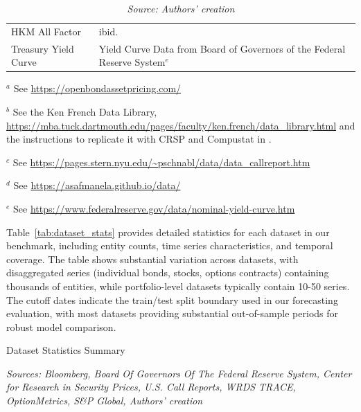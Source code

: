 \documentclass{article}
\begin{document}
\begin{table}[htbp]
\begin{threeparttable}
\begin{tabular}{p{4cm}p{8cm}}
HKM All Factor & ibid. \\
Treasury Yield Curve & Yield Curve Data from Board of Governors of the Federal Reserve System$^{e}$ \\
\bottomrule
\end{tabular}
\begin{tablenotes}
\footnotesize
\item[$^{a}$] See \url{https://openbondassetpricing.com/}
\item[$^{b}$] See the Ken French Data Library, \url{https://mba.tuck.dartmouth.edu/pages/faculty/ken.french/data_library.html} and the instructions to replicate it with CRSP and Compustat in \citet{Fama2023}.
\item[$^{c}$] See \url{https://pages.stern.nyu.edu/~pschnabl/data/data_callreport.htm}
\item[$^{d}$] See \url{https://asafmanela.github.io/data/}
\item[$^{e}$] See \url{https://www.federalreserve.gov/data/nominal-yield-curve.htm}
\end{tablenotes}
\end{threeparttable}
\caption*{\emph{Source: Authors' creation}}
\end{table}

Table~\ref{tab:dataset_stats} provides detailed statistics for each dataset in our benchmark, including entity counts, time series characteristics, and temporal coverage. The table shows substantial variation across datasets, with disaggregated series (individual bonds, stocks, options contracts) containing thousands of entities, while portfolio-level datasets typically contain 10-50 series. The cutoff dates indicate the train/test split boundary used in our forecasting evaluation, with most datasets providing substantial out-of-sample periods for robust model comparison.

\begin{table}[htbp]
\centering
\caption{Dataset Statistics Summary}
\label{tab:dataset_stats}

\vspace{0.1cm}
\scriptsize
\caption*{\emph{Sources: Bloomberg, Board Of Governors Of The Federal Reserve System, Center for Research in Security Prices, U.S. Call Reports, WRDS TRACE, OptionMetrics, S\&P Global,  Authors' creation}}
\end{table}
\end{document}
